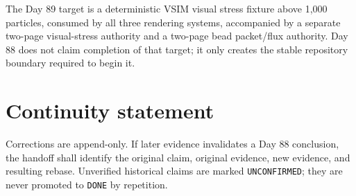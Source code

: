 \documentclass[10pt]{article}
\begin{document}
The Day 89 target is a deterministic VSIM visual stress fixture above 1,000 particles, consumed by all three rendering systems, accompanied by a separate two-page visual-stress authority and a two-page bead packet/flux authority. Day 88 does not claim completion of that target; it only creates the stable repository boundary required to begin it.

\section*{Continuity statement}
Corrections are append-only. If later evidence invalidates a Day 88 conclusion, the handoff shall identify the original claim, original evidence, new evidence, and resulting rebase. Unverified historical claims are marked \texttt{UNCONFIRMED}; they are never promoted to \texttt{DONE} by repetition.
\end{document}
